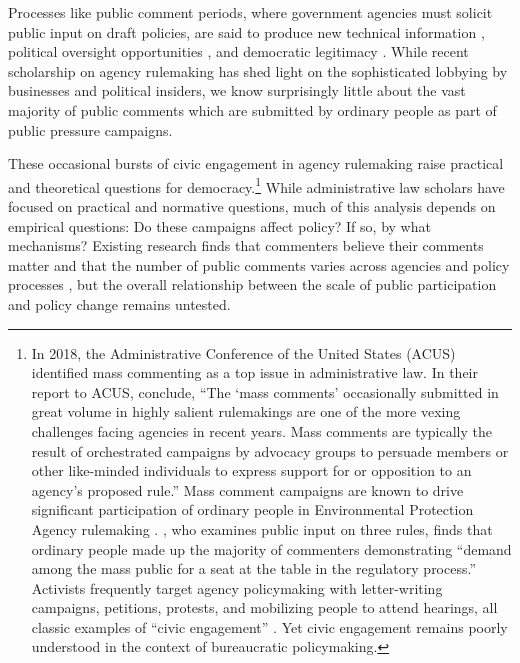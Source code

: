 \documentclass{article}
\begin{document}

Processes like public comment periods, where government agencies must solicit public input on draft policies, are said to produce new technical information \citep{Yackee2006JPART, Nelson2012}, political oversight opportunities \citep{Balla1998, Mccubbins1984}, and democratic legitimacy \citep{Croley2003, Rosenbloom2003}.%
While recent scholarship on agency rulemaking has shed light on the sophisticated lobbying by businesses and political insiders, we know surprisingly little about the vast majority of public comments which are submitted by ordinary people as part of public pressure campaigns. 

These occasional bursts of civic engagement in agency rulemaking raise practical and theoretical questions for democracy.\footnote{In 2018, the Administrative Conference of the United States (ACUS) identified mass commenting as a top issue in administrative law. In their report to ACUS, \citet{SantAmbrogio2018} conclude, ``The `mass comments' occasionally submitted in great volume in highly salient rulemakings are one of the more vexing challenges facing agencies in recent years. Mass comments are typically the result of orchestrated campaigns by advocacy groups to persuade members or other like-minded individuals to express support for or opposition to an agency's proposed rule.'' 
Mass comment campaigns are known to drive significant participation of ordinary people in Environmental Protection Agency rulemaking \citep{Potter2017, Balla2018}. \citet{Cuellar2005}, who examines public input on three rules, finds that ordinary people made up the majority of commenters demonstrating ``demand among the mass public for a seat at the table in the regulatory process.'' Activists frequently target agency policymaking with letter-writing campaigns, petitions, protests, and mobilizing people to attend hearings, all classic examples of ``civic engagement'' \citep{Verba1987}. Yet civic engagement remains poorly understood in the context of bureaucratic policymaking.} 
While administrative law scholars have focused on practical and normative questions, much of this analysis depends on empirical questions: Do these campaigns affect policy? If so, by what mechanisms? Existing research finds that commenters believe their comments matter \citep{Yackee2015JPART} and that the number of public comments varies across agencies and policy processes \citep{Moore2017}, 
but the overall relationship between the scale of public participation and policy change remains untested. 
\end{document}
